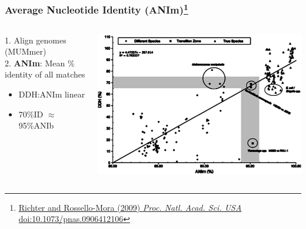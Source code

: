 \begin{frame}
  \frametitle{Average Nucleotide Identity (ANIm)\footnote{\tiny{\href{http://dx.doi.org/10.1073/pnas.0906412106}{Richter and Rossello-Mora (2009) \textit{Proc. Natl. Acad. Sci. USA} doi:10.1073/pnas.0906412106}}}}
  \begin{columns}[T]
    \begin{column}{3cm}
      1. Align genomes (MUMmer)\\
      2. \textcolor{hutton_green}{\textbf{ANIm}: Mean \% identity of all matches} \\[0.25cm]
      \begin{itemize}
        \item DDH:ANIm linear
        \item \textcolor{hutton_blue}{70\%ID $\approx$ 95\%ANIb}
      \end{itemize}
    \end{column}
    \begin{column}{7cm}
      \includegraphics[width=1\textwidth]{images/ddh_anim}
    \end{column}
  \end{columns}
\end{frame}

